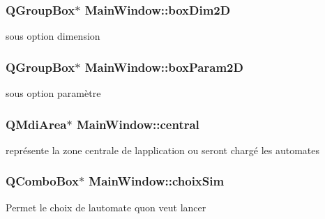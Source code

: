 \subsubsection[{\texorpdfstring{box\+Dim2D}{boxDim2D}}]{\setlength{\rightskip}{0pt plus 5cm}Q\+Group\+Box$\ast$ Main\+Window\+::box\+Dim2D\hspace{0.3cm}{\ttfamily [private]}}\hypertarget{class_main_window_ad25e047b431ec6c6d244c9d4a3355582}{}\label{class_main_window_ad25e047b431ec6c6d244c9d4a3355582}
sous option dimension 
\subsubsection[{\texorpdfstring{box\+Param2D}{boxParam2D}}]{\setlength{\rightskip}{0pt plus 5cm}Q\+Group\+Box$\ast$ Main\+Window\+::box\+Param2D\hspace{0.3cm}{\ttfamily [private]}}\hypertarget{class_main_window_aa758e230a66e84a946b125af5df55618}{}\label{class_main_window_aa758e230a66e84a946b125af5df55618}
sous option paramètre 
\subsubsection[{\texorpdfstring{central}{central}}]{\setlength{\rightskip}{0pt plus 5cm}Q\+Mdi\+Area$\ast$ Main\+Window\+::central\hspace{0.3cm}{\ttfamily [private]}}\hypertarget{class_main_window_a9c7c0dfa79f78e05a3745962c680cd18}{}\label{class_main_window_a9c7c0dfa79f78e05a3745962c680cd18}
représente la zone centrale de l\textquotesingle{}application ou seront chargé les automates 
\subsubsection[{\texorpdfstring{choix\+Sim}{choixSim}}]{\setlength{\rightskip}{0pt plus 5cm}Q\+Combo\+Box$\ast$ Main\+Window\+::choix\+Sim\hspace{0.3cm}{\ttfamily [private]}}\hypertarget{class_main_window_a11ee55d02a2bccaf673267f930bc0f90}{}\label{class_main_window_a11ee55d02a2bccaf673267f930bc0f90}
Permet le choix de l\textquotesingle{}automate qu\textquotesingle{}on veut lancer 
